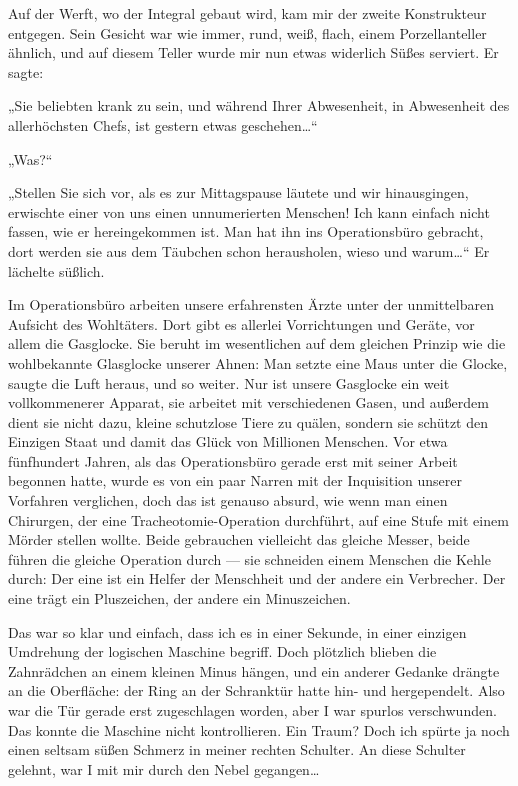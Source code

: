 Auf der Werft, wo der Integral gebaut wird, kam mir der zweite
Konstrukteur entgegen. Sein Gesicht war wie
immer, rund, weiß, flach, einem Porzellanteller ähnlich, und auf
diesem Teller wurde mir nun etwas widerlich Süßes serviert. Er
sagte:

„Sie beliebten krank zu sein, und während Ihrer Abwesenheit, in
Abwesenheit des allerhöchsten Chefs, ist gestern etwas geschehen\ldots{}“

„Was?“

„Stellen Sie sich vor, als es zur Mittagspause läutete und wir
hinausgingen, erwischte einer von uns einen unnumerierten Menschen!
Ich kann einfach nicht fassen, wie er hereingekommen ist. Man hat
ihn ins Operationsbüro gebracht, dort werden sie aus dem Täubchen
schon herausholen, wieso und warum\ldots{}“ Er lächelte süßlich.

Im
Operationsbüro arbeiten unsere erfahrensten Ärzte unter der
unmittelbaren Aufsicht des Wohltäters. Dort gibt es allerlei
Vorrichtungen und Geräte, vor allem die Gasglocke. Sie beruht im
wesentlichen auf dem gleichen Prinzip wie die wohlbekannte
Glasglocke unserer Ahnen: Man setzte eine Maus unter die Glocke,
saugte die Luft heraus, und so weiter. Nur ist unsere Gasglocke ein
weit vollkommenerer Apparat, sie arbeitet mit verschiedenen Gasen,
und außerdem dient sie nicht dazu, kleine schutzlose Tiere zu
quälen, sondern sie schützt den Einzigen Staat und damit das Glück
von Millionen Menschen. Vor etwa fünfhundert Jahren, als das
Operationsbüro gerade erst mit seiner Arbeit begonnen hatte, wurde
es von ein paar Narren mit der Inquisition unserer Vorfahren
verglichen, doch das ist genauso absurd, wie wenn man einen
Chirurgen, der eine Tracheotomie-Operation durchführt, auf eine
Stufe mit einem Mörder stellen wollte. Beide gebrauchen vielleicht
das gleiche Messer, beide führen die gleiche Operation durch — sie
schneiden einem Menschen die Kehle durch: Der eine ist ein Helfer
der Menschheit
und der andere ein Verbrecher. Der eine trägt ein Pluszeichen, der
andere ein Minuszeichen.

Das war so klar und einfach, dass ich es
in einer Sekunde, in einer einzigen Umdrehung der logischen
Maschine begriff. Doch plötzlich blieben die Zahnrädchen an einem
kleinen Minus hängen, und ein anderer Gedanke drängte an die
Oberfläche: der Ring an der Schranktür hatte hin- und hergependelt.
Also war die Tür gerade erst zugeschlagen worden, aber I war
spurlos verschwunden. Das konnte die Maschine nicht kontrollieren.
Ein Traum? Doch ich spürte ja noch einen seltsam süßen Schmerz in
meiner rechten Schulter. An diese Schulter gelehnt, war I mit mir
durch den Nebel gegangen\ldots{}

